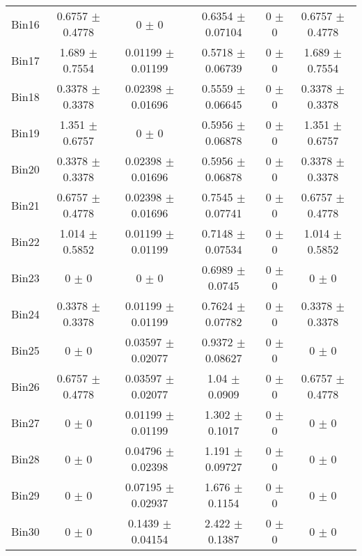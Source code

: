\begin{tabular}{@{\extracolsep{4pt}}lccccc@{}}
     Bin16 & 0.6757 $\pm$ 0.4778 & 0 $\pm$ 0 & 0.6354 $\pm$ 0.07104 & 0 $\pm$ 0 & 0.6757 $\pm$ 0.4778 \\ 
     Bin17 & 1.689 $\pm$ 0.7554 & 0.01199 $\pm$ 0.01199 & 0.5718 $\pm$ 0.06739 & 0 $\pm$ 0 & 1.689 $\pm$ 0.7554 \\ 
     Bin18 & 0.3378 $\pm$ 0.3378 & 0.02398 $\pm$ 0.01696 & 0.5559 $\pm$ 0.06645 & 0 $\pm$ 0 & 0.3378 $\pm$ 0.3378 \\ 
     Bin19 & 1.351 $\pm$ 0.6757 & 0 $\pm$ 0 & 0.5956 $\pm$ 0.06878 & 0 $\pm$ 0 & 1.351 $\pm$ 0.6757 \\ 
     Bin20 & 0.3378 $\pm$ 0.3378 & 0.02398 $\pm$ 0.01696 & 0.5956 $\pm$ 0.06878 & 0 $\pm$ 0 & 0.3378 $\pm$ 0.3378 \\ 
     Bin21 & 0.6757 $\pm$ 0.4778 & 0.02398 $\pm$ 0.01696 & 0.7545 $\pm$ 0.07741 & 0 $\pm$ 0 & 0.6757 $\pm$ 0.4778 \\ 
     Bin22 & 1.014 $\pm$ 0.5852 & 0.01199 $\pm$ 0.01199 & 0.7148 $\pm$ 0.07534 & 0 $\pm$ 0 & 1.014 $\pm$ 0.5852 \\ 
     Bin23 & 0 $\pm$ 0 & 0 $\pm$ 0 & 0.6989 $\pm$ 0.0745 & 0 $\pm$ 0 & 0 $\pm$ 0 \\ 
     Bin24 & 0.3378 $\pm$ 0.3378 & 0.01199 $\pm$ 0.01199 & 0.7624 $\pm$ 0.07782 & 0 $\pm$ 0 & 0.3378 $\pm$ 0.3378 \\ 
     Bin25 & 0 $\pm$ 0 & 0.03597 $\pm$ 0.02077 & 0.9372 $\pm$ 0.08627 & 0 $\pm$ 0 & 0 $\pm$ 0 \\ 
     Bin26 & 0.6757 $\pm$ 0.4778 & 0.03597 $\pm$ 0.02077 & 1.04 $\pm$ 0.0909 & 0 $\pm$ 0 & 0.6757 $\pm$ 0.4778 \\ 
     Bin27 & 0 $\pm$ 0 & 0.01199 $\pm$ 0.01199 & 1.302 $\pm$ 0.1017 & 0 $\pm$ 0 & 0 $\pm$ 0 \\ 
     Bin28 & 0 $\pm$ 0 & 0.04796 $\pm$ 0.02398 & 1.191 $\pm$ 0.09727 & 0 $\pm$ 0 & 0 $\pm$ 0 \\ 
     Bin29 & 0 $\pm$ 0 & 0.07195 $\pm$ 0.02937 & 1.676 $\pm$ 0.1154 & 0 $\pm$ 0 & 0 $\pm$ 0 \\ 
     Bin30 & 0 $\pm$ 0 & 0.1439 $\pm$ 0.04154 & 2.422 $\pm$ 0.1387 & 0 $\pm$ 0 & 0 $\pm$ 0 \\ 
\hline\hline
  \end{tabular}
